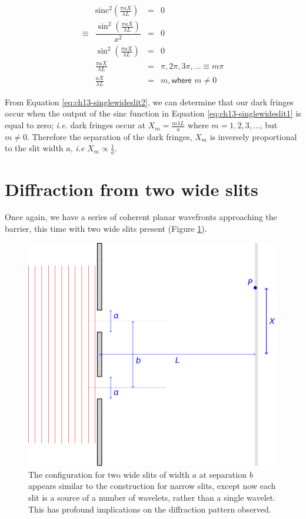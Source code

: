 \documentclass[
]{book}
\begin{document}
\begin{equation}
\begin{array}{rrcl}
&\mathrm{sinc}^2 \left(\frac{\pi a X}{\lambda L}\right) &=& 0 \\
\equiv & \dfrac{\sin^2 \left(\frac{\pi a X}{\lambda L}\right)}{x^2 }&=& 0 \\
& \sin^2 \left(\frac{\pi a X}{\lambda L}\right) &=& 0 \\
& \frac{\pi a X}{\lambda L} &=& \pi, 2\pi, 3\pi, \dots \equiv m \pi \\
& \frac{ a X}{\lambda L} &=& m , \textsf{where } m \neq 0
\end{array}
\label{eq:ch13-singlewideslit2}
\end{equation}

From Equation \eqref{eq:ch13-singlewideslit2}, we can determine that our dark fringes occur when the output of the sinc function in Equation \eqref{eq:ch13-singlewideslit1} is equal to zero; \emph{i.e.} dark fringes occur at \(X_m = \frac{m\lambda L}{a}\) where \(m = 1, 2, 3, \dots\), but \(m \neq 0\). Therefore the separation of the dark fringes, \(X_m\) is inversely proportional to the slit width \(a\), \emph{i.e} \(X_m \propto \frac{1}{a}\).

\hypertarget{sec:ch13-difftwowideslits}{%
\section{Diffraction from two wide slits}\label{sec:ch13-difftwowideslits}}

Once again, we have a series of coherent planar wavefronts approaching the barrier, this time with two wide slits present (Figure \ref{fig:ch13-twowideslits1}).

\begin{figure}

{\centering \includegraphics[width=0.7\linewidth]{visualisations/LaTeX/ch13-doubleslitswide1} 

}

\caption{The configuration for two wide slits of width $a$ at separation $b$ appears similar to the construction for narrow slits, except now each slit is a source of a number of wavelets, rather than a single wavelet. This has profound implications on the diffraction pattern observed.}\label{fig:ch13-twowideslits1}
\end{figure}
\end{document}
